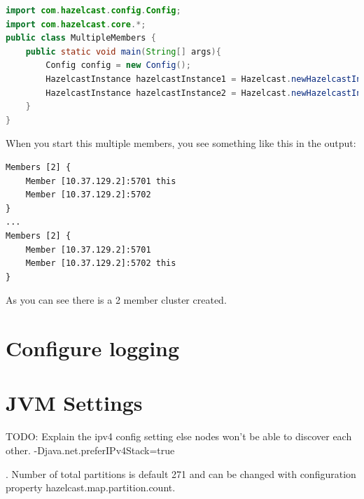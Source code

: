 \begin{lstlisting}[language=java]
import com.hazelcast.config.Config;
import com.hazelcast.core.*;
public class MultipleMembers {
    public static void main(String[] args){
        Config config = new Config();
        HazelcastInstance hazelcastInstance1 = Hazelcast.newHazelcastInstance(config);
        HazelcastInstance hazelcastInstance2 = Hazelcast.newHazelcastInstance(config);
    }
}
\end{lstlisting}
When you start this multiple members, you see something like this in the output:
\begin{verbatim}
Members [2] {
    Member [10.37.129.2]:5701 this
    Member [10.37.129.2]:5702
}
...
Members [2] {
    Member [10.37.129.2]:5701
    Member [10.37.129.2]:5702 this
}
\end{verbatim}
As you can see there is a 2 member cluster created.

\section{Configure logging}

\section{JVM Settings}
TODO: Explain the ipv4 config setting else nodes won't be able to discover each other.
-Djava.net.preferIPv4Stack=true

. Number of total partitions is default 271 and can be changed with configuration property hazelcast.map.partition.count. 
